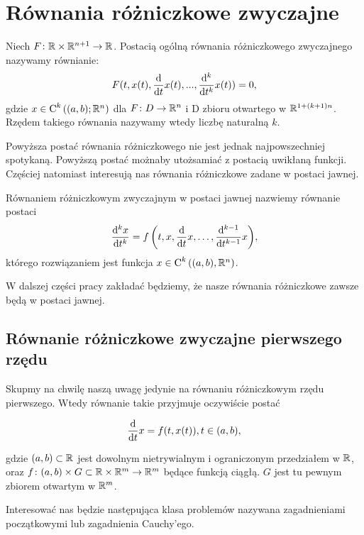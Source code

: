 \documentclass[12pt,a4paper]{report}
\begin{document}
\section{Równania różniczkowe zwyczajne}

\begin{definition}
Niech $F \colon \setR \times \setR^{n+1} \to \setR$. Postacią ogólną równania różniczkowego zwyczajnego nazywamy równianie: 
\begin{equation*}
F(t, x(t), \ddx{t} x(t),..., \ddx[^k]{t^k} x(t) ) = 0,
\end{equation*}
gdzie $x \in \Ck{k}{(a,b); \setR^n}$ dla $F \colon D \to \setR^n$ i D zbioru otwartego w $\setR^{1+(k+1)n}$. 
Rzędem takiego równania nazywamy wtedy liczbę naturalną $k$. 
\end{definition}

Powyższa postać równania różniczkowego nie jest jednak najpowszechniej spotykaną. Powyższą postać możnaby utożsamiać z postacią uwikłaną funkcji. Częściej natomiast interesują nas równania różniczkowe zadane w postaci jawnej.

\begin{definition}
Równaniem różniczkowym zwyczajnym w postaci jawnej nazwiemy równanie postaci
$$
\ddx[{^k x}]{t^k} = \function{f}{t,x,\ddx{t}x, \ldots, \ddx[{^{k-1}}]{t^{k-1}} x},
$$
którego rozwiązaniem jest funkcja $x \in \Ck{k}{(a,b), \setR^n}$.
\end{definition}

W dalszej części pracy zakładać będziemy, że nasze równania różniczkowe zawsze będą w postaci jawnej.


\subsection{Równanie różniczkowe zwyczajne pierwszego rzędu}

Skupmy na chwilę naszą uwagę jedynie na równaniu różniczkowym rzędu pierwszego. Wtedy równanie takie przyjmuje oczywiście postać 

$$
\ddx{t}x = f(t,x(t)), t \in (a,b) ,
$$ 

gdzie $(a,b) \subset \setR$ jest dowolnym nietrywialnym i ograniczonym przedziałem w $\setR$, oraz $ f \colon (a,b) \times G \subset \setR \times \setR^m \to \setR^m$ będące funkcją ciągłą. $G$ jest tu pewnym zbiorem otwartym w $\setR^m$. 

Interesować nas będzie następująca klasa problemów nazywana zagadnieniami początkowymi lub zagadnienia Cauchy'ego.
\end{document}
